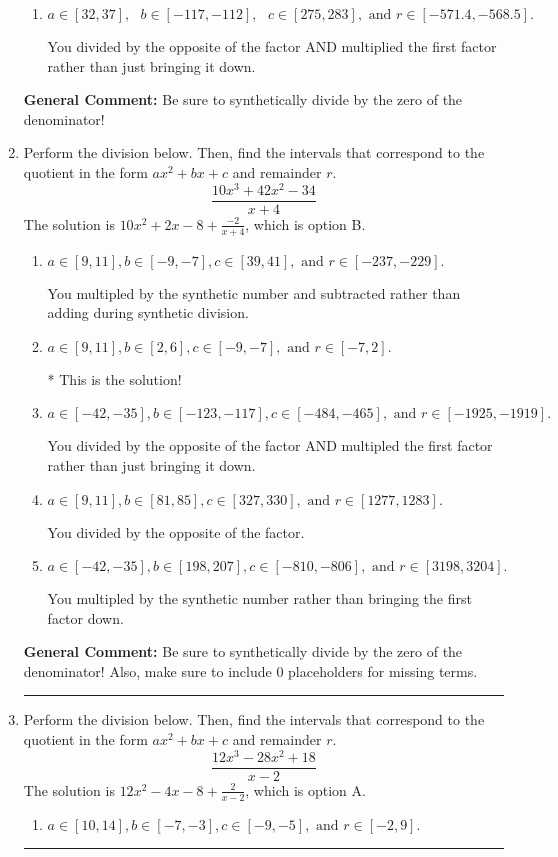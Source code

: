 \documentclass{extbook}[14pt]
\newcommand{\litem}[1]{\item #1

\rule{\textwidth}{0.4pt}}
\begin{document}
\begin{enumerate}
{\begin{enumerate}[label=\Alph*.]
 You divided by the opposite of the factor.
\item \( a \in [32, 37], \text{   } b \in [-117, -112], \text{   } c \in [275, 283], \text{   and   } r \in [-571.4, -568.5]. \)

 You divided by the opposite of the factor AND multiplied the first factor rather than just bringing it down.
\end{enumerate}

\textbf{General Comment:} Be sure to synthetically divide by the zero of the denominator!
}
\litem{
Perform the division below. Then, find the intervals that correspond to the quotient in the form $ax^2+bx+c$ and remainder $r$.
\[ \frac{10x^{3} +42 x^{2} -34}{x + 4} \]The solution is \( 10x^{2} +2 x -8 + \frac{-2}{x + 4} \), which is option B.\begin{enumerate}[label=\Alph*.]
\item \( a \in [9, 11], b \in [-9, -7], c \in [39, 41], \text{ and } r \in [-237, -229]. \)

 You multipled by the synthetic number and subtracted rather than adding during synthetic division.
\item \( a \in [9, 11], b \in [2, 6], c \in [-9, -7], \text{ and } r \in [-7, 2]. \)

* This is the solution!
\item \( a \in [-42, -35], b \in [-123, -117], c \in [-484, -465], \text{ and } r \in [-1925, -1919]. \)

 You divided by the opposite of the factor AND multipled the first factor rather than just bringing it down.
\item \( a \in [9, 11], b \in [81, 85], c \in [327, 330], \text{ and } r \in [1277, 1283]. \)

 You divided by the opposite of the factor.
\item \( a \in [-42, -35], b \in [198, 207], c \in [-810, -806], \text{ and } r \in [3198, 3204]. \)

 You multipled by the synthetic number rather than bringing the first factor down.
\end{enumerate}

\textbf{General Comment:} Be sure to synthetically divide by the zero of the denominator! Also, make sure to include 0 placeholders for missing terms.
}
\litem{
Perform the division below. Then, find the intervals that correspond to the quotient in the form $ax^2+bx+c$ and remainder $r$.
\[ \frac{12x^{3} -28 x^{2} + 18}{x -2} \]The solution is \( 12x^{2} -4 x -8 + \frac{2}{x -2} \), which is option A.\begin{enumerate}[label=\Alph*.]
\item \( a \in [10, 14], b \in [-7, -3], c \in [-9, -5], \text{ and } r \in [-2, 9]. \)


\end{enumerate}}
\end{enumerate}
\end{document}
